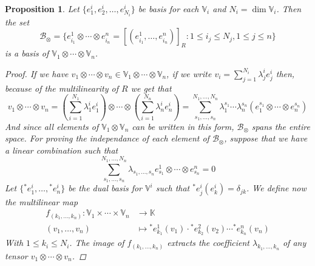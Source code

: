 \documentclass[11pt,a4paper,openright,oneside]{book}
\numberwithin{equation}{section}
\newtheorem{prop0}[defn0]{Proposition}
\newenvironment{proposition}{\bigskip \begin{prop0}}{\end{prop0}}
\begin{document}
\begin{proposition} Let $\{e_1^i, e_2^i, \dots, e_{N_i}^i\}$ be basis for each $\mathbb{V}_i$ and $N_i = \dim \mathbb{V}_i$. Then the set
$$\mathcal{B}_{\otimes} = \{e_{i_1}^1 \otimes \cdots \otimes e_{i_n}^n = [(e_{i_1}^1, \dots, e_{i_n}^n)]_R : 1 \leqslant i_j \leqslant N_j, 1 \leqslant j \leqslant n\}$$
is a basis of $\mathbb{V}_1 \otimes \cdots \otimes \mathbb{V}_n$.
\begin{proof}
If we have $v_1 \otimes \cdots \otimes v_n \in \mathbb{V}_1 \otimes \cdots \otimes \mathbb{V}_n$, if we write
$v_i = \displaystyle\sum_{j=1}^{N_i} \lambda_j^i e_j^i$ then, because of the multilinearity of $R$ we get that
$$v_1 \otimes \cdots \otimes v_n = \left(\sum_{i=1}^{N_1} \lambda_1^i e_1^i \right) \otimes \cdots \otimes 
\left( \sum_{i=1}^{N_n} \lambda_n^i e_n^i \right) = \sum_{s_1, \dots, s_n}^{N_1, \dots, N_n} \lambda_{1}^{s_1} \cdots \lambda_n^{s_n} (e_1^{s_1} \otimes \cdots \otimes e_n^{s_n})$$
And since all elements of $\mathbb{V}_1 \otimes \mathbb{V}_n$ can be written in this form, $\mathcal{B}_\otimes$ spans the entire space. For proving
the independance of each element of $\mathcal{B}_\otimes$, suppose that we have a linear combination such that
\begin{equation}
\sum_{s_1, \dots, s_n}^{N_1, \dots, N_n} \lambda_{s_1, \dots, s_n} e_{s_1}^1 \otimes \cdots \otimes e_{s_n}^n = 0
\label{eq:base_rep}
\end{equation}
Let $\{\phantom{}^* e_1^i, \dots, \phantom{}^* e_n^i \}$ be the dual basis for $\mathbb{V}^i$ such that $\phantom{}^* e_j^i (e_k^i) = \delta_{jk}$. We define now the multilinear map
$$\begin{align}
    f_{(k_1, \dots, k_n)}: \mathbb{V}_1 \times \cdots \times \mathbb{V}_n & \longrightarrow \mathbb{K} \\
    (v_1, \dots, v_n) & \longmapsto \phantom{}^* e_{k_1}^1 (v_1) \cdot \phantom{}^* e_{k_2}^2 (v_2) \cdots \phantom{}^* e_{k_n}^n (v_n)
\end{align}$$
With $1 \leqslant k_i \leqslant N_i$. The image of $f_{(k_1, \dots, k_n)}$ extracts the coefficient $\lambda_{k_1, \dots, k_n}$ of any tensor $v_1 \otimes \cdots \otimes v_n$.


\end{proof}
\end{proposition}
\end{document}

